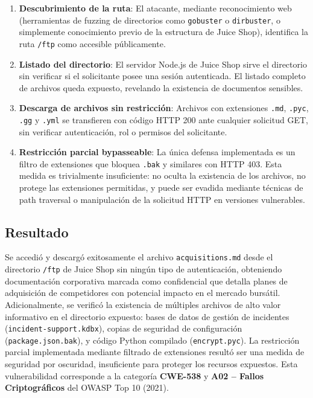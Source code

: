 \documentclass[12pt, letterpaper]{article}
\begin{document}
\begin{enumerate}
  \item \textbf{Descubrimiento de la ruta}: El atacante, mediante reconocimiento web (herramientas de fuzzing de directorios como \texttt{gobuster} o \texttt{dirbuster}, o simplemente conocimiento previo de la estructura de Juice Shop), identifica la ruta \texttt{/ftp} como accesible públicamente.
  \item \textbf{Listado del directorio}: El servidor Node.js de Juice Shop sirve el directorio sin verificar si el solicitante posee una sesión autenticada. El listado completo de archivos queda expuesto, revelando la existencia de documentos sensibles.
  \item \textbf{Descarga de archivos sin restricción}: Archivos con extensiones \texttt{.md}, \texttt{.pyc}, \texttt{.gg} y \texttt{.yml} se transfieren con código HTTP 200 ante cualquier solicitud GET, sin verificar autenticación, rol o permisos del solicitante.
  \item \textbf{Restricción parcial bypasseable}: La única defensa implementada es un filtro de extensiones que bloquea \texttt{.bak} y similares con HTTP 403. Esta medida es trivialmente insuficiente: no oculta la existencia de los archivos, no protege las extensiones permitidas, y puede ser evadida mediante técnicas de path traversal o manipulación de la solicitud HTTP en versiones vulnerables.
\end{enumerate}

\subsection{Resultado}

Se accedió y descargó exitosamente el archivo \texttt{acquisitions.md} desde el directorio \texttt{/ftp} de Juice Shop sin ningún tipo de autenticación, obteniendo documentación corporativa marcada como confidencial que detalla planes de adquisición de competidores con potencial impacto en el mercado bursátil. Adicionalmente, se verificó la existencia de múltiples archivos de alto valor informativo en el directorio expuesto: bases de datos de gestión de incidentes (\texttt{incident-support.kdbx}), copias de seguridad de configuración (\texttt{package.json.bak}), y código Python compilado (\texttt{encrypt.pyc}). La restricción parcial implementada mediante filtrado de extensiones resultó ser una medida de seguridad por oscuridad, insuficiente para proteger los recursos expuestos. Esta vulnerabilidad corresponde a la categoría \textbf{CWE-538} y \textbf{A02 -- Fallos Criptográficos} del OWASP Top 10 (2021).
\end{document}
